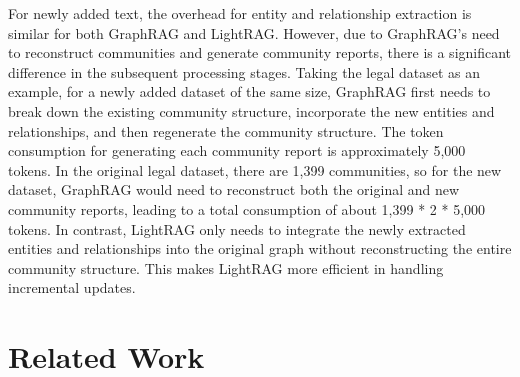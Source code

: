 \documentclass{article} %
\begin{document}
For newly added text, the overhead for entity and relationship extraction is similar for both GraphRAG and LightRAG. However, due to GraphRAG's need to reconstruct communities and generate community reports, there is a significant difference in the subsequent processing stages. Taking the legal dataset as an example, for a newly added dataset of the same size, GraphRAG first needs to break down the existing community structure, incorporate the new entities and relationships, and then regenerate the community structure. The token consumption for generating each community report is approximately 5,000 tokens. In the original legal dataset, there are 1,399 communities, so for the new dataset, GraphRAG would need to reconstruct both the original and new community reports, leading to a total consumption of about 1,399 * 2 * 5,000 tokens. In contrast, LightRAG only needs to integrate the newly extracted entities and relationships into the original graph without reconstructing the entire community structure. This makes LightRAG more efficient in handling incremental updates.



\vspace{-0.1in}

\section{Related Work}
\label{sec:relate}

\vspace{-0.1in}
\end{document}

